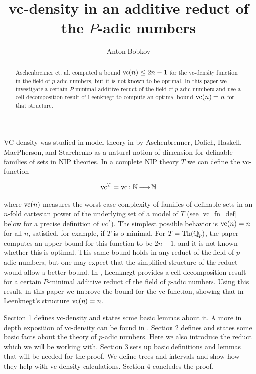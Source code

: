 \documentclass{amsart}
\title{vc-density in an additive reduct of the $P$-adic numbers}
\author{Anton Bobkov}
\begin{document}
\begin{abstract}
  Aschenbrenner et. al. computed a bound $\operatorname{vc}(n) \leq 2n - 1$ for the vc-density function in the field of $p$-adic numbers,
  but it is not known to be optimal.
  In this paper we investigate a certain $P$-minimal additive reduct of the field of $p$-adic numbers and
  use a cell decomposition result of Leenknegt to compute an optimal bound $\operatorname{vc}(n) = n$ for that structure.
\end{abstract}


\maketitle

VC-density was studied in model theory in \cite{density} by Aschenbrenner, Dolich, Haskell, MacPherson, and Starchenko
as a natural notion of dimension for definable families of sets in NIP theories.
In a complete NIP theory $T$ we can define the vc-function

\begin{align*}
  \operatorname{vc}^T = \operatorname{vc} : \mathbb{N} \operatorname{\longrightarrow} \mathbb{N}
\end{align*}

where $\operatorname{vc}(n)$ measures the worst-case complexity of families of definable sets in an $n$-fold cartesian power of the underlying set of a model of $T$
(see \ref{vc_fn_def} below for a precise definition of $vc^T$).
The simplest possible behavior is $\operatorname{vc}(n) = n$ for all $n$,
satisfied, for example, if $T$ is o-minimal.
For $T = \operatorname{Th}(\mathbb{Q}_p)$, the paper \cite{density} computes an upper bound for this function to be $2n-1$, and it is not known whether this is optimal.
This same bound holds in any reduct of the field of $p$-adic numbers, but one may expect that the simplified structure of the reduct would allow a better bound.
In \cite{reduct}, Leenknegt provides a cell decomposition result for a certain $P$-minimal additive reduct of the field of $p$-adic numbers.
Using this result, in this paper we improve the bound for the vc-function, showing that in Leenknegt's structure $\operatorname{vc}(n) = n$.

Section 1 defines vc-density and states some basic lemmas about it.
A more in depth exposition of vc-density can be found in \cite{density}.
Section 2 defines and states some basic facts about the theory of $p$-adic numbers.
Here we also introduce the reduct which we will be working with.
Section 3 sets up basic definitions and lemmas that will be needed for the proof.
We define trees and intervals and show how they help with vc-density calculations.
Section 4 concludes the proof.
\end{document}
